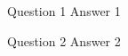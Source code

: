 \documentclass[avery5371,grid,frame]{flashcards}
\begin{document}
\begin{flashcard}[Chapter]{Question 1}
    Answer 1
\end{flashcard}

\begin{flashcard}[Chapter]{Question 2}
    Answer 2
\end{flashcard}
\end{document}
